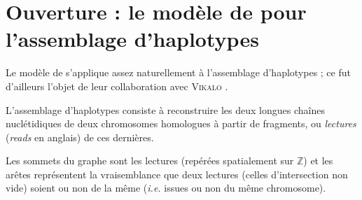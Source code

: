 \section{Ouverture : le modèle de \SB{} pour l'assemblage d'haplotypes}
\label{sec:chapII_haplotypes}

Le modèle de \SB{} s'applique assez naturellement à l'assemblage d'haplotypes ; ce fut d'ailleurs l'objet de leur collaboration avec \textsc{Vikalo} \cite{SankararamanVikaloBaccelli2020}.

L'assemblage d'haplotypes consiste à reconstruire les deux longues chaînes nuclétidiques de deux chromosomes homologues à partir de fragments, ou \emph{lectures} (\emph{reads} en anglais) de ces dernières.

Les sommets du graphe sont les lectures (repérées spatialement sur $\mathbb Z$) et les arêtes représentent la vraisemblance que deux lectures (celles d'intersection non vide) soient ou non de la même  (\emph{i.e.} issues ou non du même chromosome).

